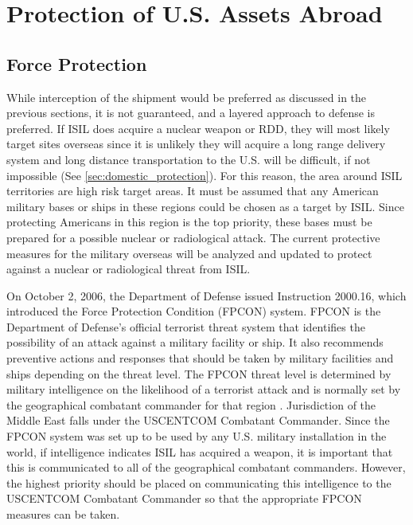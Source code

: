\documentclass{report}
\begin{document}
\section{Protection of U.S. Assets Abroad}

\subsection{Force Protection}

While interception of the shipment would be preferred as discussed in the previous sections, it is not guaranteed, and a layered approach to defense is preferred.  If ISIL does acquire a nuclear weapon or RDD, they will most likely target sites overseas since it is unlikely they will acquire a long range delivery system and long distance transportation to the U.S. will be difficult, if not impossible (See \autoref{sec:domestic_protection}).  For this reason, the area around ISIL territories are high risk target areas.  It must be assumed that any American military bases or ships in these regions could be chosen as a target by ISIL.  Since protecting Americans in this region is the top priority, these bases must be prepared for a possible nuclear or radiological attack.  The current protective measures for the military overseas will be analyzed and updated to protect against a nuclear or radiological threat from ISIL.

On October 2, 2006, the Department of Defense issued Instruction 2000.16, which introduced the Force Protection Condition (FPCON) system.  FPCON is the Department of Defense's official terrorist threat system that identifies the possibility of an attack against a military facility or ship.  It also recommends preventive actions and responses that should be taken by military facilities and ships depending on the threat level.  The FPCON threat level is determined by military intelligence on the likelihood of a terrorist attack and is normally set by the geographical combatant commander for that region \cite{Usd2006}.  Jurisdiction of the Middle East falls under the USCENTCOM Combatant Commander.  Since the FPCON system was set up to be used by any U.S. military installation in the world, if intelligence indicates ISIL has acquired a weapon, it is important that this is communicated to all of the geographical combatant commanders.  However, the highest priority should be placed on communicating this intelligence to the USCENTCOM Combatant Commander so that the appropriate FPCON measures can be taken.
\end{document}

